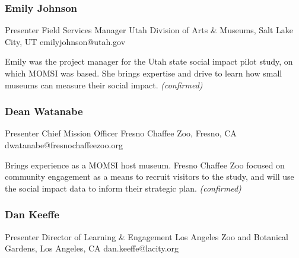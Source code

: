 \documentclass{report}
\begin{document}
              

              
                \subsubsection*{ Emily  Johnson }
                Presenter\newline
                Field Services Manager\newline
                Utah Division of Arts \& Museums, Salt Lake City, UT
                \newline
                emilyjohnson@utah.gov\newline
                
                

                Emily was the project manager for the Utah state social impact pilot study, on which MOMSI was based. She brings expertise and drive to learn how small museums can measure their social impact.
                \emph{ (confirmed) }
              

              
                \subsubsection*{ Dean Watanabe }
                Presenter\newline
                Chief Mission Officer\newline
                Fresno Chaffee Zoo, Fresno, CA
                \newline
                dwatanabe@fresnochaffeezoo.org\newline
                
                

                Brings experience as a MOMSI host museum. Fresno Chaffee Zoo focused on community engagement as a means to recruit visitors to the study, and will use the social impact data to inform their strategic plan.
                \emph{ (confirmed) }
              

              
                \subsubsection*{ Dan Keeffe }
                Presenter\newline
                Director of Learning \& Engagement\newline
                Los Angeles Zoo and Botanical Gardens, Los Angeles, CA
                \newline
                dan.keeffe@lacity.org\newline
                
\end{document}
